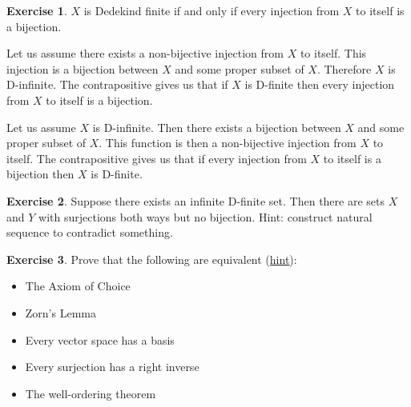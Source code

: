 \documentclass{article}
\theoremstyle{definition}
\newtheorem{exer}{Exercise}[section]
\newlength{\defparindent}
\newenvironment{answer}
    {\begin{mdframed}[backgroundcolor=gray!15, linewidth=0pt] \setlength{\parindent}{\defparindent}}
    {\end{mdframed}}
\begin{document}
\begin{exer}
    $X$ is Dedekind finite if and only if every injection from $X$ to itself is a bijection.
    \begin{answer}
        Let us assume there exists a  non-bijective injection from $X$ to itself. This injection is a bijection between $X$ and some proper subset of $X$. Therefore $X$ is D-infinite. The contrapositive gives us that if $X$ is D-finite then every injection from $X$ to itself is a bijection.

        Let us assume $X$ is D-infinite. Then there exists a bijection between $X$ and some proper subset of $X$. This function is then a non-bijective injection from $X$ to itself. The contrapositive gives us that if every injection from $X$ to itself is a bijection then $X$ is D-finite.
    \end{answer}
\end{exer}

\begin{exer}
    Suppose there exists an infinite D-finite set. Then there are sets $X$ and $Y$ with surjections both ways but no bijection. Hint: construct natural sequence to contradict something.
\end{exer}

\begin{exer}
    Prove that the following are equivalent (\href{https://dept.math.lsa.umich.edu/~ablass/bases-AC.pdf}{hint}):
    \begin{itemize}
        \item The Axiom of Choice
        \item Zorn's Lemma
        \item Every vector space has a basis
        \item Every surjection has a right inverse
        \item The well-ordering theorem 
    \end{itemize}
\end{exer}
\end{document}
